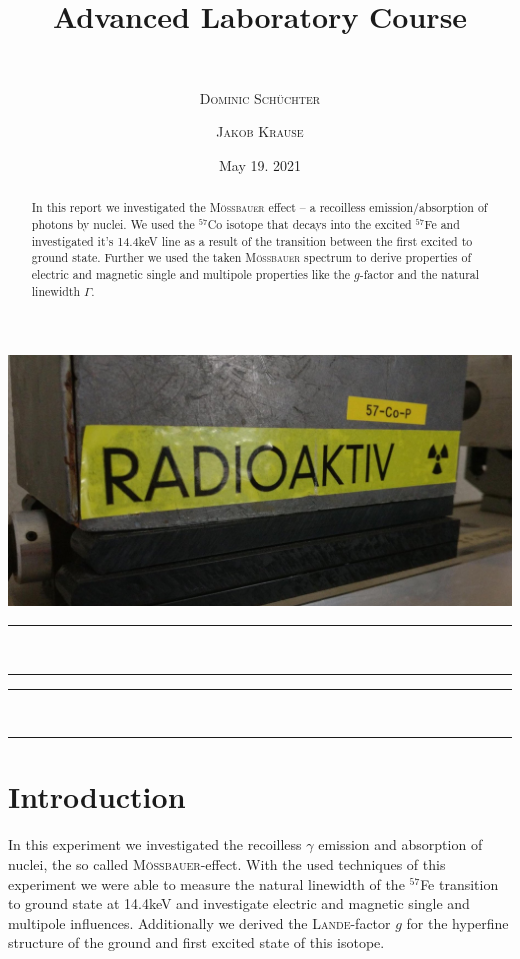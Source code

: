 \documentclass[11pt,a4paper,notitlepage]{scrartcl}
\title{ Advanced Laboratory Course}
\subtitle{\name  \\ \hrulefill}
\date{May 19. 2021\\}
\author[*]{\textsc{Dominic Schüchter}}
\author[$\dagger$]{\textsc{Jakob Krause}}
\affil[*]{\href{mailto:dschuechter@uni-bonn.de}{\faEnvelope  \hspace*{0.1cm}dschuechter@uni-bonn.de} {\color{black}$|$} \href{https://github.com/dschuechter}{\faGithub  \hspace*{0.1cm}dschuechter}}
\affil[$\dagger$]{\href{mailto:krause.jakob@uni-bonn.de}{\faEnvelope  \hspace*{0.1cm}krause.jakob@uni-bonn.de} {\color{black}$|$} \href{https://github.com/krausejm}{\faGithub  \hspace*{0.1cm}krausejm}}
\begin{document}
\maketitle
\vspace{-.8cm}
\thispagestyle{empty}
\begin{center}
\includegraphics[width=\linewidth]{God}
\vspace{-.2cm}

\rule{12cm}{1pt} \\\vspace{-.6cm} \rule{10cm}{1pt}
\end{center}



\begin{abstract}
	In this report we investigated the \textsc{Mö\ss bauer} effect -- a recoilless emission/absorption of photons by nuclei. We used the $^{57}$Co isotope that decays into the excited  $^{57}$Fe  and investigated it's 14.4keV line as a result of the transition between the first excited to ground state. Further we used the taken \textsc{Mö\ss bauer} spectrum to derive properties of electric and magnetic single and multipole properties like the $g$-factor and the natural linewidth $\Gamma$.
\end{abstract}
\begin{center}
	 \rule{10cm}{1pt} \\\vspace{-.6cm} \rule{12cm}{1pt}
\end{center}

\setcounter{page}{-1}
\newpage

\tableofcontents
\thispagestyle{empty}
\newpage
\section{Introduction}
In this experiment we investigated the recoilless $\gamma$ emission and absorption of nuclei, the so called \textsc{Mö\ss bauer}-effect. With the used techniques of this experiment we were able to measure the natural linewidth of the $^{57}$Fe transition to ground state at 14.4keV and investigate electric and magnetic single and multipole influences. Additionally we derived the \textsc{Lande}-factor $g$ for the hyperfine structure of the ground and first excited state of this isotope.
\end{document}
